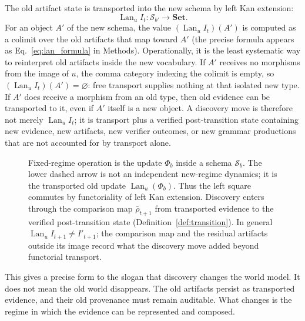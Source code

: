 \documentclass[11pt]{article}
\theoremstyle{definition}
\newcommand{\Sschema}{\mathcal{S}}
\newcommand{\Set}{\mathbf{Set}}
\newcommand{\Lan}{\operatorname{Lan}}
\begin{document}
The old artifact state is transported into the new schema by left Kan extension:
\begin{equation}
\Lan_u I_t:\Sschema_{b'}\longrightarrow \Set .
\label{eq:lan_transport}
\end{equation}
For an object $A'$ of the new schema, the value $(\Lan_u I_t)(A')$ is computed as a colimit over the old artifacts that map toward $A'$ (the precise formula appears as Eq.~\ref{eq:lan_formula} in Methods). Operationally, it is the least systematic way to reinterpret old artifacts inside the new vocabulary. If $A'$ receives no morphisms from the image of $u$, the comma category indexing the colimit is empty, so $(\Lan_u I_t)(A')=\varnothing$: free transport supplies nothing at that isolated new type. If $A'$ does receive a morphism from an old type, then old evidence can be transported to it, even if $A'$ itself is a new object. A discovery move is therefore not merely $\Lan_u I_t$; it is transport plus a verified post-transition state containing new evidence, new artifacts, new verifier outcomes, or new grammar productions that are not accounted for by transport alone.

\begin{figure}[t]
\centering
{}
\caption{Fixed-regime operation is the update $\Phi_b$ inside a schema $\Sschema_b$. The lower dashed arrow is not an independent new-regime dynamics; it is the transported old update $\Lan_u(\Phi_b)$. Thus the left square commutes by functoriality of left Kan extension. Discovery enters through the comparison map $\bar\rho_{t+1}$ from transported evidence to the verified post-transition state (Definition~\ref{def:transition}). In general $\Lan_u I_{t+1}\neq I'_{t+1}$; the comparison map and the residual artifacts outside its image record what the discovery move added beyond functorial transport.}
\label{fig:kan_extension}
\end{figure}

This gives a precise form to the slogan that discovery changes the world model. It does not mean the old world disappears. The old artifacts persist as transported evidence, and their old provenance must remain auditable. What changes is the regime in which the evidence can be represented and composed.
\end{document}

